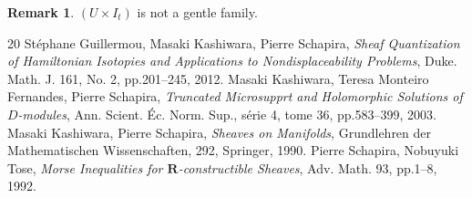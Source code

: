 ﻿\documentclass[a4paper,leqno]{jsarticle}
\theoremstyle{definition}
\newtheorem{Remark+}[Axiom+]{Remark}
\newcommand{\rr}{\mathbf{R}}
\numberwithin{equation}{section}
\theoremstyle{mystyle}
\begin{document}
\begin{Remark+}
  \((U\times I_t)\) is not a gentle family.  
\end{Remark+}


\begin{thebibliography}{20} 
   St\'ephane Guillermou, 
  Masaki Kashiwara, Pierre Schapira, 
  \textit{Sheaf Quantization of Hamiltonian Isotopies and Applications to Nondisplaceability Problems}, 
  Duke. Math. J. 161, No. 2, pp.201--245, 2012.  
   Masaki Kashiwara, Teresa Monteiro Fernandes, Pierre Schapira, 
    \textit{Truncated Microsupprt and Holomorphic Solutions 
    of \(D\)-modules}, 
    Ann. Scient. \'Ec. Norm. Sup., s\'erie 4, tome 36, 
    pp.583--399, 2003.
   Masaki Kashiwara, Pierre Schapira, 
    \textit{Sheaves on Manifolds}, 
    Grundlehren der Mathematischen Wissenschaften, 292, Springer, 1990.
   Pierre Schapira, Nobuyuki Tose, 
    \textit{Morse Inequalities for \(\rr\)-constructible Sheaves}, 
    Adv. Math. 93, pp.1--8, 1992. 
\end{thebibliography}

\end{document}
